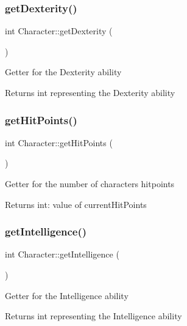 \subsubsection{\texorpdfstring{get\+Dexterity()}{getDexterity()}}
{\footnotesize\ttfamily int Character\+::get\+Dexterity (\begin{DoxyParamCaption}{ }\end{DoxyParamCaption})}

Getter for the Dexterity ability \begin{DoxyReturn}{Returns}
int representing the Dexterity ability 
\end{DoxyReturn}
\hypertarget{classCharacter_ac28870a30c9b451f55c3e27adaabfbfa}{}\label{classCharacter_ac28870a30c9b451f55c3e27adaabfbfa} 
\subsubsection{\texorpdfstring{get\+Hit\+Points()}{getHitPoints()}}
{\footnotesize\ttfamily int Character\+::get\+Hit\+Points (\begin{DoxyParamCaption}{ }\end{DoxyParamCaption})}

Getter for the number of character\textquotesingle{}s hitpoints \begin{DoxyReturn}{Returns}
int\+: value of current\+Hit\+Points 
\end{DoxyReturn}
\hypertarget{classCharacter_a0cd463a2b68c2cc2b73707b859709635}{}\label{classCharacter_a0cd463a2b68c2cc2b73707b859709635} 
\subsubsection{\texorpdfstring{get\+Intelligence()}{getIntelligence()}}
{\footnotesize\ttfamily int Character\+::get\+Intelligence (\begin{DoxyParamCaption}{ }\end{DoxyParamCaption})}

Getter for the Intelligence ability \begin{DoxyReturn}{Returns}
int representing the Intelligence ability 
\end{DoxyReturn}
\hypertarget{classCharacter_ade8602e9521fc4c1849d1d1026bc0399}{}\label{classCharacter_ade8602e9521fc4c1849d1d1026bc0399} 
